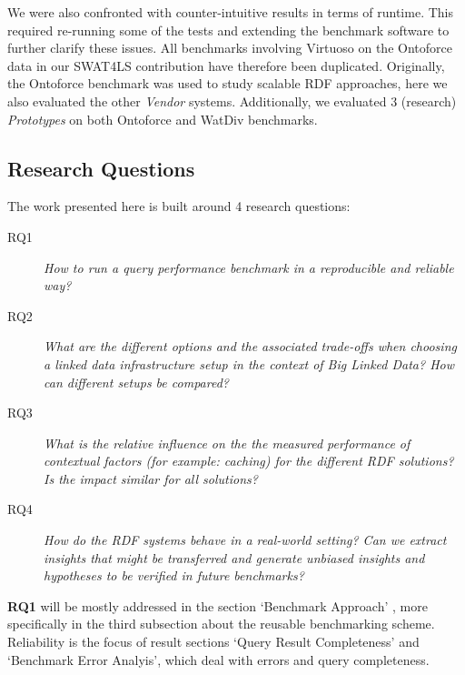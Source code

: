 We were also confronted with counter-intuitive results in terms of runtime. This required re-running some of the tests and extending the benchmark software to further clarify these issues. All benchmarks involving Virtuoso on the Ontoforce data in our SWAT4LS contribution have therefore been duplicated.
Originally, the Ontoforce benchmark was used to study scalable RDF approaches, here we also evaluated the other \emph{Vendor} systems. Additionally, we evaluated 3 (research) \emph{Prototypes} on both Ontoforce and WatDiv benchmarks.


\subsection{Research Questions}

The work presented here is built around 4 research questions:

\begin{description}
\item[RQ1] \emph{How to run a query performance benchmark in a reproducible and reliable way?}
\item[RQ2] \emph{What are the different options and the associated trade-offs when choosing a linked data infrastructure setup in the context of Big Linked Data? How can different setups be compared?}
\item[RQ3] \emph{What is the relative influence on the the measured performance of contextual factors (for example: caching) for the different RDF solutions? Is the impact similar for all solutions?}
\item[RQ4] \emph{How do the RDF systems behave in a real-world setting? Can we extract insights that might be transferred and generate unbiased insights and hypotheses to be verified in future benchmarks?}
\end{description} 

\textbf{RQ1} will be mostly addressed in the section `Benchmark Approach' , more specifically in the third subsection about the reusable benchmarking scheme. Reliability is the focus of result sections `Query Result Completeness' and `Benchmark Error Analyis', 
which deal with errors and query completeness. 

